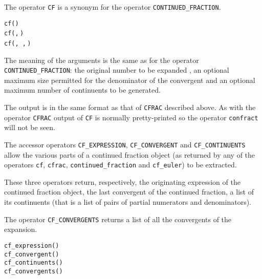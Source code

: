 \hypertarget{CF:operator}{}

The operator \texttt{CF}  is a
synonym for the operator \texttt{CONTINUED\_FRACTION}.
\begin{syntaxtable}
  \texttt{cf(}\texttt{)}\\
  \texttt{cf(}\texttt{,}\,\texttt{)}\\
  \texttt{cf(}\texttt{,}\,%
  \texttt{,}\,\texttt{)}
\end{syntaxtable}

The meaning of the arguments is the same as for the operator
\texttt{CONTINUED\_FRACTION}: the original number to be expanded
, an optional maximum size  permitted for the
denominator of the convergent and an optional maximum number of continuents
 to be generated.

The output is in the same format as that of \texttt{CFRAC} described above.
As with the operator \texttt{CFRAC} output of \texttt{CF} is normally
pretty-printed so the operator \texttt{confract} will not be seen.

\hypertarget{CF_EXPRESSION:operator}{}
\hypertarget{CF_cONTINUENTS:operator}{}
\hypertarget{CF_CONVERGENT:operator}{}
\hypertarget{CF_CONVERGENTS:operator}{}

The accessor operators \texttt{CF\_EXPRESSION},
\texttt{CF\_CONVERGENT} and
\texttt{CF\_CONTINUENTS} allow
the various parts of a continued fraction object 
(as returned by any of the operators \texttt{cf}, \texttt{cfrac},
\texttt{continued\_fraction} and \texttt{cf\_euler}) to be extracted.

These three operators return, respectively, the originating
expression of the continued fraction object, the last convergent of the
continued fraction, a list of its continuents
(that is a list of pairs of partial numerators and denominators).

The operator \texttt{CF\_CONVERGENTS} 
returns a list of all the convergents of the expansion.
\begin{syntaxtable}
  \texttt{cf\_expression(}\texttt{)} \\
  \texttt{cf\_convergent(}\texttt{)} \\
  \texttt{cf\_continuents(}\texttt{)} \\
  \texttt{cf\_convergents(}\texttt{)}
\end{syntaxtable}

